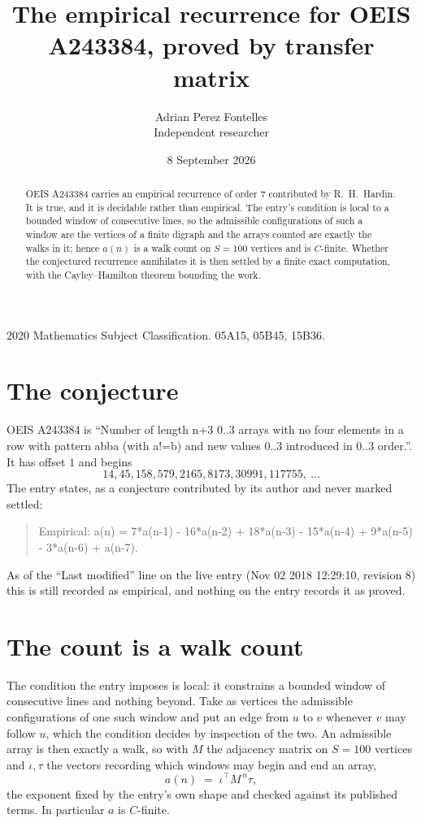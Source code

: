 \documentclass[11pt,a4paper]{article}
\title{The empirical recurrence for OEIS A243384, proved by transfer matrix}
\author{Adrian Perez Fontelles\\ \small Independent researcher}
\date{8 September 2026}
\theoremstyle{plain}
\theoremstyle{definition}
\begin{document}
\maketitle

\begin{abstract}
OEIS A243384 carries an empirical recurrence of order $7$ contributed by R.~H.~Hardin. It is
true, and it is decidable rather than empirical. The entry's condition is local to a bounded window of consecutive lines, so
the admissible configurations of such a window are the vertices of a finite digraph and the
arrays counted are exactly the walks in it; hence $a(n)$ is a walk count on $S=100$ vertices
and is $C$-finite. Whether the conjectured recurrence annihilates it is then settled by a
finite exact computation, with the Cayley--Hamilton theorem bounding the work.
\end{abstract}

\noindent\small 2020 Mathematics Subject Classification. 05A15, 05B45, 15B36.\normalsize

\section{The conjecture}

OEIS A243384 is ``Number of length n+3 0..3 arrays with no four elements in a row with pattern abba (with a!=b) and new values 0..3 introduced in 0..3 order.''. It has offset $1$ and begins
\[
14, 45, 158, 579, 2165, 8173, 30991, 117755,\ \dots
\]
The entry states, as a conjecture contributed by its author and never marked settled:
\begin{quote}
Empirical: a(n) = 7*a(n-1) - 16*a(n-2) + 18*a(n-3) - 15*a(n-4) + 9*a(n-5) - 3*a(n-6) + a(n-7).
\end{quote}
As of the ``Last modified'' line on the live entry (Nov 02 2018 12:29:10, revision 8) this is still
recorded as empirical, and nothing on the entry records it as proved.

\section{The count is a walk count}

The condition the entry imposes is local: it constrains a bounded window of consecutive lines and nothing beyond. Take as
vertices the admissible configurations of one such window and put an edge from $u$ to $v$
whenever $v$ may follow $u$, which the condition decides by inspection of the two. An
admissible array is then exactly a walk, so with $M$ the adjacency matrix on $S=100$ vertices
and $\iota,\tau$ the vectors recording which windows may begin and end an array,
\[
a(n)\;=\;\iota^{\!\top}M^{\,n}\tau ,
\]
the exponent fixed by the entry's own shape and checked against its published terms. In
particular $a$ is $C$-finite.
\end{document}

